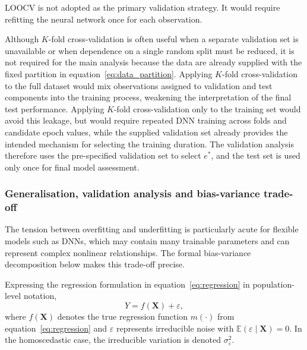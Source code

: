 \noindent
LOOCV is not adopted as the primary validation strategy. It would require
refitting the neural network once for each observation.

\noindent
Although \(K\)-fold cross-validation is often useful when a separate validation
set is unavailable or when dependence on a single random split must be reduced,
it is not required for the main analysis because the data are already supplied
with the fixed partition in equation~\eqref{eq:data_partition}. Applying
\(K\)-fold cross-validation to the full dataset would mix observations assigned
to validation and test components into the training process, weakening the
interpretation of the final test performance. Applying \(K\)-fold
cross-validation only to the training set would avoid this leakage, but would
require repeated DNN training across folds and candidate epoch values,
while the supplied validation set already provides the intended mechanism for
selecting the training duration. The validation analysis therefore uses the
pre-specified validation set to select \(e^{\ast}\), and the test set is used
only once for final model assessment.

\subsubsection{Generalisation, validation analysis and bias-variance trade-off}
\label{sec:generalisation_validation_bias_variance}

\noindent
The tension between overfitting and underfitting is particularly acute for
flexible models such as DNNs, which may contain many trainable
parameters and can represent complex nonlinear relationships. The formal
bias-variance decomposition below makes this trade-off precise.

\noindent
Expressing the regression formulation in equation~\eqref{eq:regression} in
population-level notation,
\begin{equation}
\label{eq:general_regression}
    Y
    =
    f(\mathbf{X})
    +
    \varepsilon,
\end{equation}
where \(f(\mathbf{X})\) denotes the true regression function
\(m(\cdot)\) from equation~\eqref{eq:regression} and \(\varepsilon\) represents
irreducible noise with \(\mathbb{E}(\varepsilon\mid\mathbf{X})=0\). In the
homoscedastic case, the irreducible variation is denoted
\(\sigma_{\varepsilon}^{2}\).

